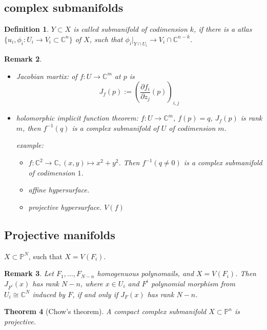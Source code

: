 \documentclass{article}
\newtheorem{definition}{Definition}[subsection]
\newtheorem{theorem}[definition]{Theorem}
\newtheorem{remark}[definition]{Remark}
\begin{document}
\subsection{complex submanifolds}
\begin{definition}
  $Y \subset X$ is called submanifold of codimension $k$, if there is a atlas $\{u_{i},\phi_{i}:U_{i}\to V_{i} \subset \mathbb{C}^{n}\} $ of $X$, such that $\phi_{i}|_{Y \cap U_{i}}\to V_{i} \cap \mathbb{C}^{n-k}$.
\end{definition}
\begin{remark}
  \begin{itemize}
    \item Jacobian martix: of $f:U\to \mathbb{C}^{m}$ at $p$ is
      \[
      J_{f}(p):= {\left( \frac{\partial f_{i}}{\partial z_{j}}(p) \right)}_{i,j}
      \]
    \item holomorphic implicit function theorem: $f:U\to \mathbb{C}^{m}$, $f(p)=q$, $J_{f}(p)$ is rank $m$, then $f^{-1}(q)$ is a complex submanifold of $U$ of codimension $m$.

      example: 
    \begin{itemize}
      \item 
        $f: \mathbb{C}^{2}\to \mathbb{C}, (x,y) \mapsto x^2+y^2$. Then $f^{-1}(q\neq 0)$ is a complex submanifold of codimension $1$.
      \item affine hypersurface.
      \item projective hypersurface. $V(f)$
    \end{itemize}
  \end{itemize}
\end{remark}
\subsection{Projective manifolds}
$X \subset \mathbb{P}^{N}$, such that $X=V(F_{i})$.

\begin{remark}
  Let $F_{1},\ldots ,F_{N-n}$ homogenuous polynomails, and  $X=V(F_{i})$. Then  $J_{F^{i}}(x)$ has rank $N-n$, where $x\in U_{i}$ and  $F^{i}$ polynomial morphism from $U_{i}\cong \mathbb{C}^{N}$ induced by $F$,   if and only if $J_{F}(x)$ has rank $N-n$.
\end{remark}
\begin{theorem}[Chow's theorem]
  A compact complex submanifold $X \subset \mathbb{P}^{n}$ is projective.
\end{theorem}
\end{document}
